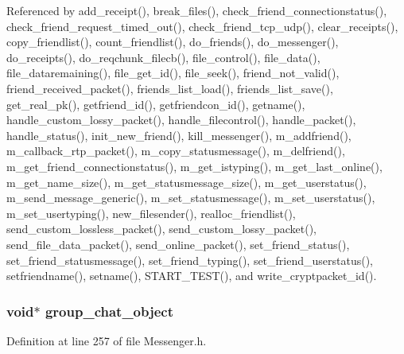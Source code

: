 Referenced by add\+\_\+receipt(), break\+\_\+files(), check\+\_\+friend\+\_\+connectionstatus(), check\+\_\+friend\+\_\+request\+\_\+timed\+\_\+out(), check\+\_\+friend\+\_\+tcp\+\_\+udp(), clear\+\_\+receipts(), copy\+\_\+friendlist(), count\+\_\+friendlist(), do\+\_\+friends(), do\+\_\+messenger(), do\+\_\+receipts(), do\+\_\+reqchunk\+\_\+filecb(), file\+\_\+control(), file\+\_\+data(), file\+\_\+dataremaining(), file\+\_\+get\+\_\+id(), file\+\_\+seek(), friend\+\_\+not\+\_\+valid(), friend\+\_\+received\+\_\+packet(), friends\+\_\+list\+\_\+load(), friends\+\_\+list\+\_\+save(), get\+\_\+real\+\_\+pk(), getfriend\+\_\+id(), getfriendcon\+\_\+id(), getname(), handle\+\_\+custom\+\_\+lossy\+\_\+packet(), handle\+\_\+filecontrol(), handle\+\_\+packet(), handle\+\_\+status(), init\+\_\+new\+\_\+friend(), kill\+\_\+messenger(), m\+\_\+addfriend(), m\+\_\+callback\+\_\+rtp\+\_\+packet(), m\+\_\+copy\+\_\+statusmessage(), m\+\_\+delfriend(), m\+\_\+get\+\_\+friend\+\_\+connectionstatus(), m\+\_\+get\+\_\+istyping(), m\+\_\+get\+\_\+last\+\_\+online(), m\+\_\+get\+\_\+name\+\_\+size(), m\+\_\+get\+\_\+statusmessage\+\_\+size(), m\+\_\+get\+\_\+userstatus(), m\+\_\+send\+\_\+message\+\_\+generic(), m\+\_\+set\+\_\+statusmessage(), m\+\_\+set\+\_\+userstatus(), m\+\_\+set\+\_\+usertyping(), new\+\_\+filesender(), realloc\+\_\+friendlist(), send\+\_\+custom\+\_\+lossless\+\_\+packet(), send\+\_\+custom\+\_\+lossy\+\_\+packet(), send\+\_\+file\+\_\+data\+\_\+packet(), send\+\_\+online\+\_\+packet(), set\+\_\+friend\+\_\+status(), set\+\_\+friend\+\_\+statusmessage(), set\+\_\+friend\+\_\+typing(), set\+\_\+friend\+\_\+userstatus(), setfriendname(), setname(), S\+T\+A\+R\+T\+\_\+\+T\+E\+S\+T(), and write\+\_\+cryptpacket\+\_\+id().

\hypertarget{struct_messenger_accf717ba3e14c38e1611b17b78eed25c}{
\subsubsection[{group\+\_\+chat\+\_\+object}]{\setlength{\rightskip}{0pt plus 5cm}void$\ast$ group\+\_\+chat\+\_\+object}}\label{struct_messenger_accf717ba3e14c38e1611b17b78eed25c}


Definition at line 257 of file Messenger.\+h.



